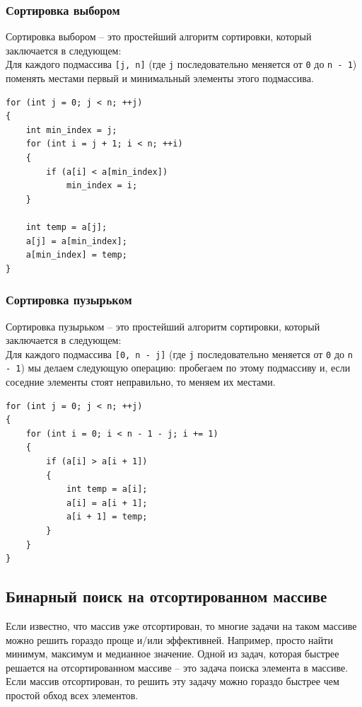 \documentclass[10pt]{article}
\begin{document}
\subsubsection*{Сортировка выбором} 
Сортировка выбором -- это простейший алгоритм сортировки, который заключается в следующем: \\
Для каждого подмассива \texttt{[j, n]} (где \texttt{j} последовательно меняется от \texttt{0} до \texttt{n - 1}) поменять местами первый и минимальный элементы этого подмассива. 


\begin{lstlisting}
for (int j = 0; j < n; ++j)
{
    int min_index = j;
    for (int i = j + 1; i < n; ++i)
    {
        if (a[i] < a[min_index])
            min_index = i;
    }

    int temp = a[j];
    a[j] = a[min_index];
    a[min_index] = temp;
}
\end{lstlisting}

\subsubsection*{Сортировка пузырьком} 
Сортировка пузырьком -- это простейший алгоритм сортировки, который заключается в следующем: \\
Для каждого подмассива \texttt{[0, n - j]} (где \texttt{j} последовательно меняется от \texttt{0} до \texttt{n - 1}) мы делаем следующую операцию: пробегаем по этому подмассиву и, если соседние элементы стоят неправильно, то меняем их местами.


\begin{lstlisting}
for (int j = 0; j < n; ++j)
{
    for (int i = 0; i < n - 1 - j; i += 1)
    {
        if (a[i] > a[i + 1])
        {
            int temp = a[i];
            a[i] = a[i + 1];
            a[i + 1] = temp;
        }
    }
}
\end{lstlisting}


\subsection*{Бинарный поиск на отсортированном массиве}
Если известно, что массив уже отсортирован, то многие задачи на таком массиве можно решить гораздо проще и/или эффективней. Например, просто найти минимум, максимум и медианное значение. Одной из задач, которая быстрее решается на отсортированном массиве -- это задача поиска элемента в массиве. Если массив отсортирован, то решить эту задачу можно гораздо быстрее чем простой обход всех элементов. \\
\end{document}
